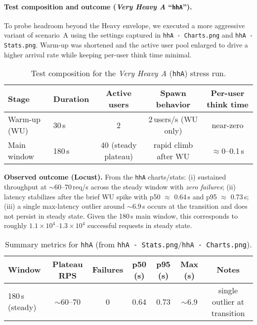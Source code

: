 \documentclass[11pt,a4paper]{article}
\begin{document}
\paragraph{Test composition and outcome (\emph{Very Heavy A} “\texttt{hhA}”).}
To probe headroom beyond the Heavy envelope, we executed a more aggressive variant of scenario~A using the settings captured in \texttt{hhA - Charts.png} and \texttt{hhA - Stats.png}. Warm-up was shortened and the active user pool enlarged to drive a higher arrival rate while keeping per-user think time minimal.

\begin{table}[h]
\centering
\small
\caption{Test composition for the \emph{Very Heavy A} (\texttt{hhA}) stress run.}
\label{tab:hhA-plan}
\begin{tabular}{llccc}
\toprule
Stage & Duration & Active users & Spawn behavior & Per-user think time \\
\midrule
Warm-up (WU) & 30\,s  & 2 & 2\,users/s (WU only) & near-zero \\
Main window  & 180\,s & 40 (steady plateau) & rapid climb after WU & $\approx$0--0.1\,s \\
\bottomrule
\end{tabular}
\end{table}

\noindent\textbf{Observed outcome (Locust).}
From the \texttt{hhA} charts/stats:
(i) sustained throughput at $\sim$60--70\,req/s across the steady window with \emph{zero failures};
(ii) latency stabilizes after the brief WU spike with p50 $\approx$ 0.64\,s and p95 $\approx$ 0.73\,s;
(iii) a single max-latency outlier around $\sim$6.9\,s occurs at the transition and does not persist in steady state.
Given the 180\,s main window, this corresponds to roughly $1.1\times 10^4$--$1.3\times 10^4$ successful requests in steady state.

\begin{table}[h]
\centering
\small
\caption{Summary metrics for \texttt{hhA} (from \texttt{hhA - Stats.png}/\texttt{hhA - Charts.png}).}
\label{tab:hhA-metrics}
\begin{tabular}{lcccccc}
\toprule
Window & Plateau RPS & Failures & p50 (s) & p95 (s) & Max (s) & Notes \\
\midrule
180\,s (steady) & $\sim$60--70 & 0 & 0.64 & 0.73 & $\sim$6.9 & single outlier at transition \\
\bottomrule
\end{tabular}
\end{table}
\end{document}
